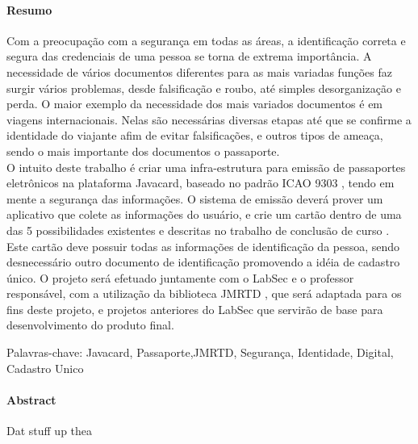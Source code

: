 \documentclass{article}
\begin{document}
	\paragraph{\large Resumo}
		\begin{flushleft}
			\begin{large}
			\hspace{2cm} Com a preocupação com a segurança em todas as áreas, a identificação correta e segura das credenciais de uma pessoa se torna de extrema importância. A necessidade de vários documentos diferentes para as mais variadas funções faz surgir vários problemas, desde falsificação e roubo, até simples desorganização e perda.
O maior exemplo da necessidade dos mais variados documentos é em viagens internacionais. Nelas são necessárias diversas etapas até que se confirme a identidade do viajante afim de evitar falsificações, e outros tipos de ameaça, sendo o mais importante dos documentos o passaporte.\\
O intuito deste trabalho é criar uma infra-estrutura para emissão de passaportes eletrônicos na plataforma Javacard, baseado no padrão ICAO 9303 \cite{ICAO}, tendo em mente a segurança das informações. O sistema de emissão deverá prover um aplicativo que colete as informações do usuário, e crie um cartão dentro de uma das 5 possibilidades existentes e descritas no trabalho de conclusão de curso \cite{SASSO}.
Este cartão deve possuir todas as informações de identificação da pessoa, sendo desnecessário outro documento de identificação promovendo a idéia de cadastro único. 
O projeto será efetuado juntamente com o LabSec e o professor responsável, com a utilização da biblioteca JMRTD \cite{JMRTD}, que será adaptada para os fins deste projeto, e projetos anteriores do LabSec que servirão de base para desenvolvimento do produto final. 
	\vspace{1cm}

Palavras-chave: Javacard, Passaporte,JMRTD, Segurança, Identidade, Digital, Cadastro Unico
			\end{large}
		\end{flushleft}


	\paragraph{\large Abstract}
		\begin{flushleft}

			Dat stuff up thea

		\end{flushleft}
	
\end{document}
